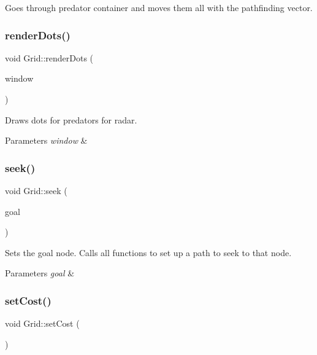 Goes through predator container and moves them all with the pathfinding vector. 

\mbox{\label{class_grid_aa58165416bcc766774296f0c8b057d2b}} 
\subsubsection{\texorpdfstring{renderDots()}{renderDots()}}
{\footnotesize\ttfamily void Grid\+::render\+Dots (\begin{DoxyParamCaption}\item[{sf\+::\+Render\+Window \&}]{window }\end{DoxyParamCaption})}



Draws dots for predators for radar. 


\begin{DoxyParams}{Parameters}
{\em window} & \\
\hline
\end{DoxyParams}
\mbox{\label{class_grid_ada242a904e942e6d4a97f458ea3e7ae7}} 
\subsubsection{\texorpdfstring{seek()}{seek()}}
{\footnotesize\ttfamily void Grid\+::seek (\begin{DoxyParamCaption}\item[{int}]{goal }\end{DoxyParamCaption})}



Sets the goal node. Calls all functions to set up a path to seek to that node. 


\begin{DoxyParams}{Parameters}
{\em goal} & \\
\hline
\end{DoxyParams}
\mbox{\label{class_grid_ab241558dff6456fdfc66c03a09d33479}} 
\subsubsection{\texorpdfstring{setCost()}{setCost()}}
{\footnotesize\ttfamily void Grid\+::set\+Cost (\begin{DoxyParamCaption}{ }\end{DoxyParamCaption})\hspace{0.3cm}{\ttfamily [private]}}



